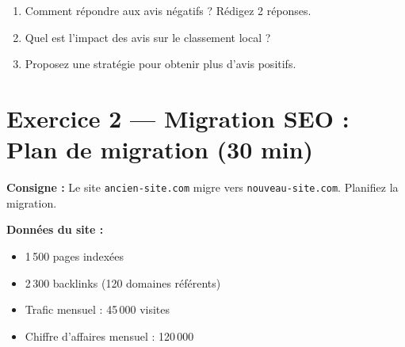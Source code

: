 \documentclass[12pt,a4paper]{report}
\begin{document}
\begin{enumerate}
    \item Comment r\'{e}pondre aux avis n\'{e}gatifs ? R\'{e}digez 2 r\'{e}ponses.
    \item Quel est l'impact des avis sur le classement local ?
    \item Proposez une strat\'{e}gie pour obtenir plus d'avis positifs.
\end{enumerate}

\section{Exercice 2 --- Migration SEO : Plan de migration (30 min)}

\textbf{Consigne :} Le site \texttt{ancien-site.com} migre vers \texttt{nouveau-site.com}. Planifiez la migration.

\textbf{Donn\'{e}es du site :}
\begin{itemize}
    \item 1\,500 pages index\'{e}es
    \item 2\,300 backlinks (120 domaines r\'{e}f\'{e}rents)
    \item Trafic mensuel : 45\,000 visites
    \item Chiffre d'affaires mensuel : 120\,000\,\texteuro{}
\end{itemize}
\end{document}
